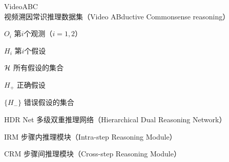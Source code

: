 
\begin{denotation}[3cm]
\item[VideoABC] 视频溯因常识推理数据集（Video ABductive Commonsense reasoning）

\item[$O_i$] 第$i$个观测（$i=1,2$）
\item[$H_i$] 第$i$个假设
\item[${\mathcal{H}}$] 所有假设的集合 
\item[$H_+$] 正确假设
\item[$\{H_-\}$] 错误假设的集合  
\item[HDR Net] 多级双重推理网络（Hierarchical Dual Reasoning Network）
\item[IRM] 步骤内推理模块（Intra-step Reasoning Module）
\item[CRM] 步骤间推理模块（Cross-step Reasoning Module） 
\end{denotation}